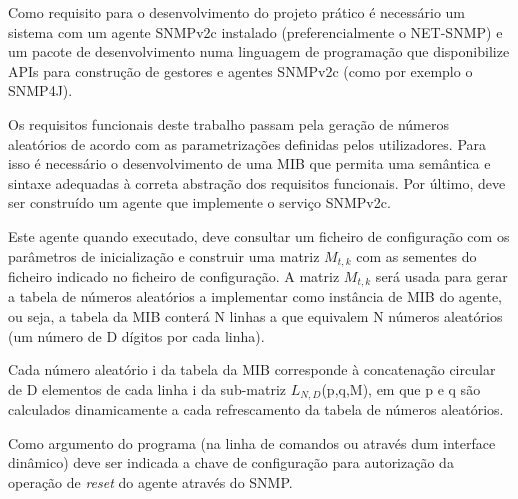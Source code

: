 \documentclass[../momento_1.tex]{subfiles}
\begin{document}
\par Como requisito para o desenvolvimento do projeto prático é necessário um sistema com um agente SNMPv2c instalado (preferencialmente o NET-SNMP) e um pacote de desenvolvimento numa linguagem de programação que disponibilize APIs para construção de gestores e agentes SNMPv2c (como por exemplo o SNMP4J).\par

\par  Os requisitos funcionais deste trabalho passam pela geração de números aleatórios de acordo com as parametrizações definidas pelos utilizadores. Para isso é necessário o desenvolvimento de uma MIB que permita uma semântica e sintaxe adequadas à correta abstração dos requisitos funcionais. Por último, deve ser construído um agente que implemente o serviço SNMPv2c. \par
Este agente quando executado, deve consultar um ficheiro de configuração com os parâmetros de inicialização e construir uma matriz $M_{t,k}$ com as sementes do ficheiro indicado no ficheiro de configuração. A matriz $M_{t,k}$ será usada para gerar a tabela de números aleatórios a implementar como instância de MIB do agente, ou seja, a tabela da MIB conterá N linhas a que equivalem N números aleatórios (um número de D dígitos por cada linha). \par
Cada número aleatório i da tabela da MIB corresponde à concatenação circular de D elementos de cada linha i da sub-matriz $L_{N,D}$(p,q,M), em que p e q são calculados dinamicamente a cada refrescamento da tabela de números aleatórios.\par
Como argumento do programa (na linha de comandos ou através dum interface dinâmico) deve ser indicada a chave de configuração para autorização da operação de \textit{reset} do agente através do SNMP.
\end{document}
